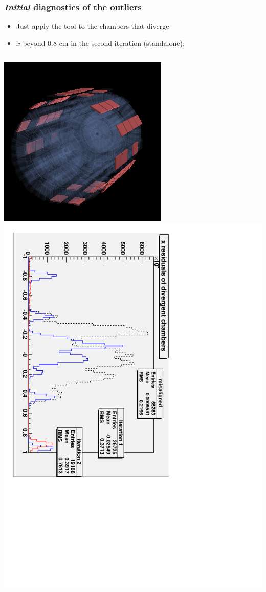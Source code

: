 \documentclass[compress]{beamer}
\begin{document}
\begin{frame}
\frametitle{{\it Initial} diagnostics of the outliers}
\begin{itemize}
\item Just apply the tool to the chambers that diverge
\item $x$ beyond 0.8 cm in the second iteration (standalone):
\end{itemize}

\vfill
\begin{columns}
\includegraphics[width=\linewidth]{divergent_chambers.png}
\includegraphics[height=1.2\linewidth, angle=90]{divergent_chambers.pdf}

\end{columns}
\end{frame}
\end{document}
